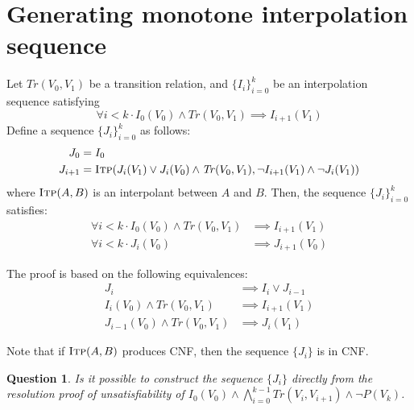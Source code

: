 \documentclass{article}
\newtheorem{question}{Question}
\newcommand{\itp}{\textsc{Itp}}
\newcommand{\Tr}{\mathit{Tr}}
\newcommand{\setof}[1]{\{#1\}}
\begin{document}
\section{Generating monotone interpolation sequence}

Let $\Tr(V_0, V_1)$ be a transition relation, and $\setof{I_i}_{i=0}^k$ be
an interpolation sequence satisfying
\begin{equation}
  \forall i < k \cdot I_0(V_0) \land \Tr(V_0, V_1) \implies I_{i+1}(V_1)
\end{equation}
Define a sequence $\setof{J_i}_{i=0}^{k}$ as follows:
\begin{align}
  J_0 &= I_0\\
  J_{i+1} &= \itp (J_i(V_1) \lor J_i(V_0) \land \Tr(V_0,V_1),
  \neg I_{i+1}(V_1) \land \neg J_i(V_1))
\end{align}
where $\itp(A,B)$ is an interpolant between $A$ and $B$. Then, the
sequence $\setof{J_i}_{i=0}^k$ satisfies:
\begin{align}
  \forall i < k \cdot I_0(V_0) \land \Tr(V_0, V_1) &\implies
  I_{i+1}(V_1)\\
  \forall i < k \cdot J_i(V_0) &\implies J_{i+1}(V_0)
\end{align}

The proof is based on the following equivalences:
\begin{align}
  J_i &\implies I_i \lor J_{i-1}\\
  I_i(V_0) \land \Tr(V_0,V_1) &\implies I_{i+1}(V_1)\\
  J_{i-1}(V_0) \land \Tr(V_0,V_1) &\implies J_i(V_1)
\end{align}

Note that if $\itp(A,B)$ produces CNF, then the sequence $\setof{J_i}$ is in
CNF.

\begin{question} Is it possible to construct the sequence $\setof{J_i}$
  directly from the resolution proof of unsatisfiability of
  $I_0(V_0)\land\bigwedge_{i=0}^{k-1} \Tr(V_i,V_{i+1})\land\neg P(V_k)$.
\end{question}
\end{document}
